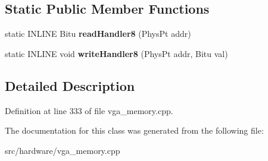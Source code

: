 \subsection*{Static Public Member Functions}
\begin{DoxyCompactItemize}
\item 
\hypertarget{classVGA__ChainedVGA__Slow__Handler_a2c5d68cdb3b70c99d265eea42d938fce}{static I\-N\-L\-I\-N\-E Bitu {\bfseries read\-Handler8} (Phys\-Pt addr)}\label{classVGA__ChainedVGA__Slow__Handler_a2c5d68cdb3b70c99d265eea42d938fce}

\item 
\hypertarget{classVGA__ChainedVGA__Slow__Handler_a26b66b53a5e61455ae92a9c394a6d6b7}{static I\-N\-L\-I\-N\-E void {\bfseries write\-Handler8} (Phys\-Pt addr, Bitu val)}\label{classVGA__ChainedVGA__Slow__Handler_a26b66b53a5e61455ae92a9c394a6d6b7}

\end{DoxyCompactItemize}


\subsection{Detailed Description}


Definition at line 333 of file vga\-\_\-memory.\-cpp.



The documentation for this class was generated from the following file\-:\begin{DoxyCompactItemize}
\item 
src/hardware/vga\-\_\-memory.\-cpp\end{DoxyCompactItemize}
